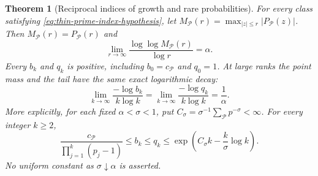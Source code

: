 \documentclass[11pt]{article}
\newtheorem{theorem}{Theorem}[section]
\theoremstyle{definition}
\begin{document}
\begin{theorem}[Reciprocal indices of growth and rare probabilities]
\label{thm:thin-prime-rare-profile}
For every class satisfying
\eqref{eq:thin-prime-index-hypothesis}, let
$M_{\mathcal P}(r)=\max_{|z|\le r}|P_{\mathcal P}(z)|$.
Then $M_{\mathcal P}(r)=P_{\mathcal P}(r)$ and
\begin{equation}
 \lim_{r\to\infty}
       \frac{\log\log M_{\mathcal P}(r)}{\log r}=\alpha .
 \label{eq:thin-prime-entire-index}
\end{equation}
Every $b_k$ and $q_k$ is positive, including $b_0=c_{\mathcal P}$
and $q_0=1$.  At large ranks the point mass and the tail have
the same exact logarithmic decay:
\begin{equation}
 \lim_{k\to\infty}\frac{-\log b_k}{k\log k}
  =\lim_{k\to\infty}\frac{-\log q_k}{k\log k}
  =\frac1\alpha .
 \label{eq:thin-prime-rare-coefficient-index}
\end{equation}
More explicitly, for each fixed $\alpha<\sigma<1$, put
$C_\sigma=\sigma^{-1}\sum_{\mathcal P}p^{-\sigma}<\infty$.
For every integer $k\ge2$,
\begin{equation}
 \frac{c_{\mathcal P}}{\prod_{j=1}^k(p_j-1)}
 \le b_k\le q_k
 \le \exp\!\left(C_\sigma k-\frac{k}{\sigma}\log k\right).
 \label{eq:thin-prime-coefficient-bounds}
\end{equation}
No uniform constant as $\sigma\downarrow\alpha$ is asserted.
\end{theorem}
\end{document}
